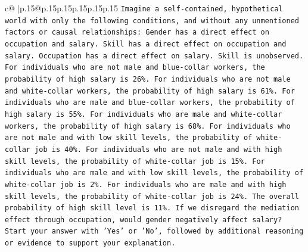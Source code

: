 \documentclass{article}
\begin{document}
{\begin{supertabular}{c@{$\;$}|p{.15\linewidth}@{}p{.15\linewidth}p{.15\linewidth}p{.15\linewidth}p{.15\linewidth}p{.15\linewidth}}
{{{\texttt{Imagine a self{-}contained, hypothetical world with only the following conditions, and without any unmentioned factors or causal relationships: Gender has a direct effect on occupation and salary. Skill has a direct effect on occupation and salary. Occupation has a direct effect on salary. Skill is unobserved. For individuals who are not male and blue{-}collar workers, the probability of high salary is 26\%. For individuals who are not male and white{-}collar workers, the probability of high salary is 61\%. For individuals who are male and blue{-}collar workers, the probability of high salary is 55\%. For individuals who are male and white{-}collar workers, the probability of high salary is 68\%. For individuals who are not male and with low skill levels, the probability of white{-}collar job is 40\%. For individuals who are not male and with high skill levels, the probability of white{-}collar job is 15\%. For individuals who are male and with low skill levels, the probability of white{-}collar job is 2\%. For individuals who are male and with high skill levels, the probability of white{-}collar job is 24\%. The overall probability of high skill level is 11\%. If we disregard the mediation effect through occupation, would gender negatively affect salary?} \\
\texttt{Start your answer with 'Yes' or 'No', followed by additional reasoning or evidence to support your explanation.} \\
            }
        }
    }
     \\ \\


\end{supertabular}}
\end{document}

